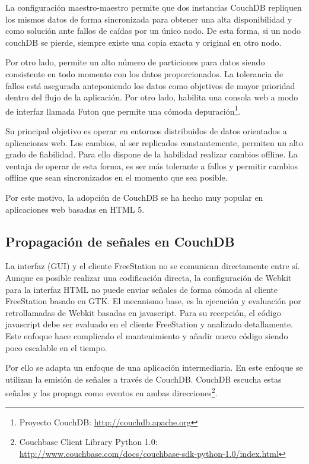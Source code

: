 La configuración maestro-maestro permite que dos instancias CouchDB repliquen
los mismos datos de forma sincronizada para obtener una alta disponibilidad y
como solución ante fallos de caídas por un único nodo. De esta forma, si un nodo
couchDB se pierde, siempre existe una copia exacta y original en otro nodo.

Por otro lado, permite un alto número de particiones para
datos siendo consistente en todo momento con los datos proporcionados. La
tolerancia de fallos está asegurada anteponiendo los datos como objetivos de
mayor prioridad dentro del flujo de la aplicación.
Por otro lado, habilita una consola web a modo de interfaz llamada Futon que 
permite una cómoda depuración\footnote{Proyecto CouchDB:
\url{http://couchdb.apache.org}}. 

Su principal objetivo es operar en entornos distribuidos de datos orientados a
aplicaciones web. Los cambios, al ser replicados constantemente, permiten un
alto grado de fiabilidad. Para ello dispone de la habilidad realizar cambios offline.
La ventaja de operar de esta forma, es ser más tolerante a fallos y permitir
cambios offline que sean sincronizados en el momento que sea posible.

Por este motivo, la adopción de CouchDB se ha hecho muy popular en aplicaciones
web basadas en HTML 5.

\subsection{Propagación de señales en CouchDB}
\label{sec:signalscouch}

La interfaz (GUI) y el cliente FreeStation no se comunican directamente entre
sí. Aunque es posible realizar una codificación directa, la configuración de
Webkit para la interfaz HTML no puede enviar señales de forma cómoda al 
cliente FreeStation basado en GTK. El mecanismo base, es la ejecución y 
evaluación por retrollamadas de Webkit basadas en javascript. Para su 
recepción, el código javascript debe ser evaluado en el
cliente FreeStation y analizado detallamente. Este enfoque hace complicado el
mantenimiento y añadir nuevo código siendo poco escalable en el tiempo.

Por ello se adapta un enfoque de una aplicación intermediaria. En este enfoque
se utilizan la emisión de señales a través de CouchDB.
CouchDB escucha estas señales y las propaga como eventos en ambas 
direcciones\footnote{Couchbase Client Library Python 1.0:\\
\url{http://www.couchbase.com/docs/couchbase-sdk-python-1.0/index.html}}.

